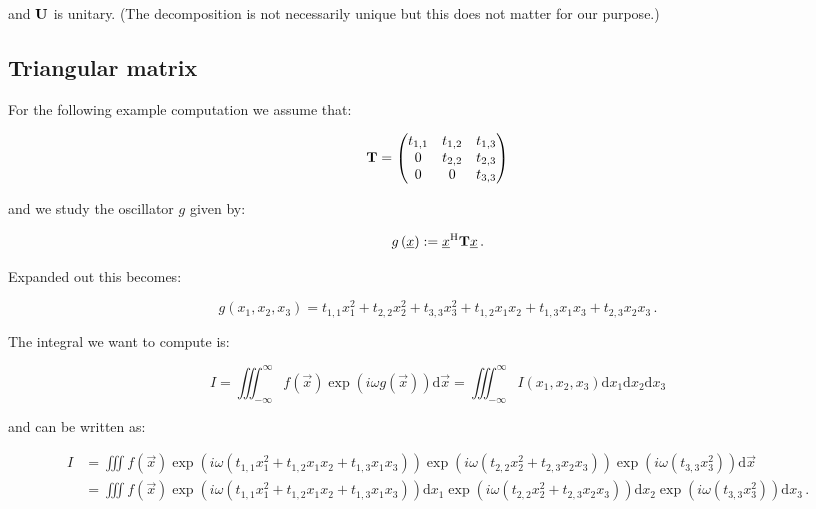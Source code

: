 \documentclass[a4paper,10pt]{article}
\begin{document}
and $\mathbf{U}$ is unitary. (The decomposition is not necessarily unique
but this does not matter for our purpose.)


\subsection{Triangular matrix}
\label{sec:mv_triag_plain}

For the following example computation we assume that:

\begin{equation}
 \mathbf{T} =
 \begin{pmatrix}
  t_{1,1} & t_{1,2} & t_{1,3} \\
  0       & t_{2,2} & t_{2,3} \\
  0       & 0       & t_{3,3}
 \end{pmatrix}
\end{equation}

and we study the oscillator $g$ given by:

\begin{equation}
 g\left(\underline{x}\right) := \underline{x}{}^{\textnormal{H}} \mathbf{T} \underline{x} \,.
\end{equation}

Expanded out this becomes:

\begin{equation}
 g\left(x_1, x_2, x_3\right) = t_{1,1} x_1^2 + t_{2,2} x_2^2 + t_{3,3} x_3^2
                             + t_{1,2} x_1 x_2 + t_{1,3} x_1 x_3 + t_{2,3} x_2 x_3 \,.
\end{equation}

The integral we want to compute is:

\begin{equation}
  I = \iiint_{-\infty}^{\infty} f\left(\vec{x}\right) \exp\left(i \omega g\left(\vec{x}\right) \right) \mathrm{d}\vec{x}
    = \iiint_{-\infty}^{\infty} I\left(x_1, x_2, x_3\right) \mathrm{d}x_1 \mathrm{d}x_2 \mathrm{d}x_3
\end{equation}

and can be written as:

\begin{equation}
\begin{split}
 I & = \iiint f\left(\vec{x}\right)
              \exp\left(i \omega \left(t_{1,1} x_1^2 + t_{1,2} x_1 x_2 + t_{1,3} x_1 x_3\right) \right)
              \exp\left(i \omega \left(t_{2,2} x_2^2 + t_{2,3} x_2 x_3\right) \right)
              \exp\left(i \omega \left(t_{3,3} x_3^2 \right) \right)
       \mathrm{d}\vec{x} \\
   & = \iiint f\left(\vec{x}\right)
              \exp\left(i \omega \left(t_{1,1} x_1^2 + t_{1,2} x_1 x_2 + t_{1,3} x_1 x_3\right) \right)
            \mathrm{d}x_1
              \exp\left(i \omega \left(t_{2,2} x_2^2 + t_{2,3} x_2 x_3\right) \right)
            \mathrm{d}x_2
              \exp\left(i \omega \left(t_{3,3} x_3^2 \right) \right)
            \mathrm{d}x_3 \,.
\end{split}
\end{equation}
\end{document}
